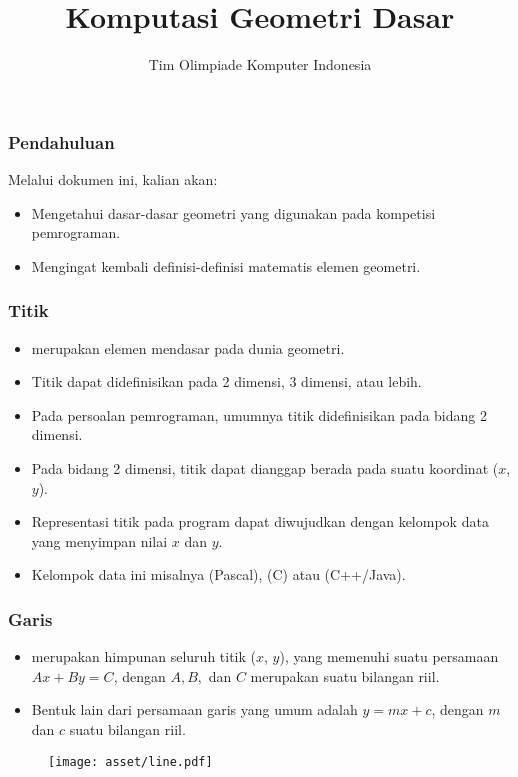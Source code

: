 

\title{Komputasi Geometri Dasar}
\author{Tim Olimpiade Komputer Indonesia}
\date{}



\begin{frame}
\titlepage
\end{frame}

\begin{frame}
\frametitle{Pendahuluan}
Melalui dokumen ini, kalian akan:
\begin{itemize}
  \item Mengetahui dasar-dasar geometri yang digunakan pada kompetisi pemrograman.
  \item Mengingat kembali definisi-definisi matematis elemen geometri.
\end{itemize}
\end{frame}

\begin{frame}
\frametitle{Titik}
\begin{itemize}
  \item {} merupakan elemen mendasar pada dunia geometri.
  \item Titik dapat didefinisikan pada 2 dimensi, 3 dimensi, atau lebih.
  \item Pada persoalan pemrograman, umumnya titik didefinisikan pada bidang 2 dimensi.
  \item Pada bidang 2 dimensi, titik dapat dianggap berada pada suatu koordinat ($x$, $y$).
  \item Representasi titik pada program dapat diwujudkan dengan kelompok data yang menyimpan nilai $x$ dan $y$.
  \item Kelompok data ini misalnya  (Pascal),  (C) atau  (C++/Java).
\end{itemize}
\end{frame}

\begin{frame}
\frametitle{Garis}
\begin{itemize}
  \item {} merupakan himpunan seluruh titik ($x$, $y$), yang memenuhi suatu persamaan $Ax + By = C$, dengan $A, B,$ dan $C$ merupakan suatu bilangan riil.
  \item Bentuk lain dari persamaan garis yang umum adalah $y = mx + c$, dengan $m$ dan $c$ suatu bilangan riil.
\end{itemize}  
\begin{figure}
  \texttt{[image: asset/line.pdf]}
\end{figure}
\end{frame}


